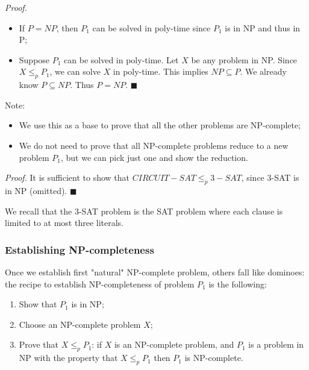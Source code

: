\textit{Proof.} 

\begin{itemize}
    \item If $P = NP$, then $P_1$ can be solved in poly-time since $P_1$ is in NP and thus in P;
    \item Suppose $P_1$ can be solved in poly-time. Let $X$ be any problem in NP. Since $X \leq_p P_1$, we can solve $X$ in poly-time. This implies $NP \subseteq P$. We already know $P \subseteq NP$. Thus $P = NP$. $\blacksquare$
\end{itemize}



Note:
\begin{itemize}
    \item We use this as a base to prove that all the other problems are NP-complete;
    \item We do not need to prove that all NP-complete problems reduce to a new problem $P_1$, but we can pick just one and show the reduction.
\end{itemize}


\textit{Proof.}
It is sufficient to show that $CIRCUIT-SAT \leq_p 3-SAT$, since 3-SAT is in NP (omitted). $\blacksquare$

We recall that the 3-SAT problem is the SAT problem where each clause is limited to at most three literals.

\subsubsection{Establishing NP-completeness}
Once we establish first "natural" NP-complete problem, others fall like dominoes: the recipe to establish NP-completeness of problem $P_1$ is the following:

\begin{enumerate}
    \item Show that $P_1$ is in NP;
    \item Choose an NP-complete problem $X$;
    \item Prove that $X \leq_p P_1$: if $X$ is an NP-complete problem, and $P_1$ is a problem in NP with the property that $X \leq_p P_1$ then $P_1$ is NP-complete.
\end{enumerate}


